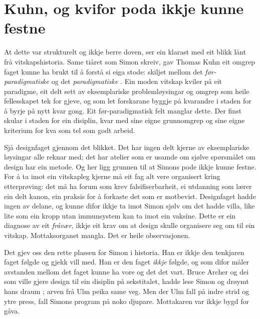 \section{Kuhn, og kvifor poda ikkje kunne festne}

At dette var strukturelt og ikkje berre doven, ser ein klarast med eit blikk lånt frå vitskapshistoria. Same tiåret som Simon skreiv, gav Thomas Kuhn eit omgrep faget kunne ha brukt til å forstå si eiga stode: skiljet mellom det \emph{før-paradigmatiske} og det \emph{paradigmatiske} \autocite{kuhn1962}. Ein moden vitskap kviler på eit paradigme, eit delt sett av eksemplariske problemløysingar og omgrep som heile fellesskapet tek for gjeve, og som let forskarane byggje på kvarandre i staden for å byrje på nytt kvar gong. Eit før-paradigmatisk felt manglar dette. Der finst skular i staden for ein disiplin, kvar med sine eigne grunnomgrep og sine eigne kriterium for kva som tel som godt arbeid.

Sjå designfaget gjennom det blikket. Det har ingen delt kjerne av eksemplariske løysingar alle reknar med; det har atelier som er usamde om sjølve spørsmålet om design har ein metode. Og her ligg grunnen til at Simons pode ikkje kunne festne. For å ta imot ein vitskapleg kjerne må eit fag alt vere organisert kring etterprøving: det må ha forum som krev falsifiserbarheit, ei utdanning som lærer ein delt kanon, ein praksis for å forkaste det som er motbevist. Designfaget hadde ingen av delane, og kunne difor ikkje ta imot Simon sjølv om det hadde villa, like lite som ein kropp utan immunsystem kan ta imot ein vaksine. Dette er ein diagnose av eit \emph{fråvær}, ikkje eit krav om at design skulle organisere seg om til ein vitskap. Mottaksorganet mangla. Det er heile observasjonen.

Det gjev oss den rette plassen for Simon i historia. Han er ikkje den tenkjaren faget følgde og gjekk vill med. Han er den faget \emph{ikkje} følgde, og som difor måler avstanden mellom det faget kunne ha vore og det det vart. Bruce Archer og dei som ville gjere design til ein disiplin på sekstitalet, hadde lese Simon og drøymt hans draum \autocite{archer1979discipline}; arven frå Ulm peika same veg. Men der Ulm fall på indre strid og ytre press, fall Simons program på noko djupare. Mottakaren var ikkje bygd for gåva.

